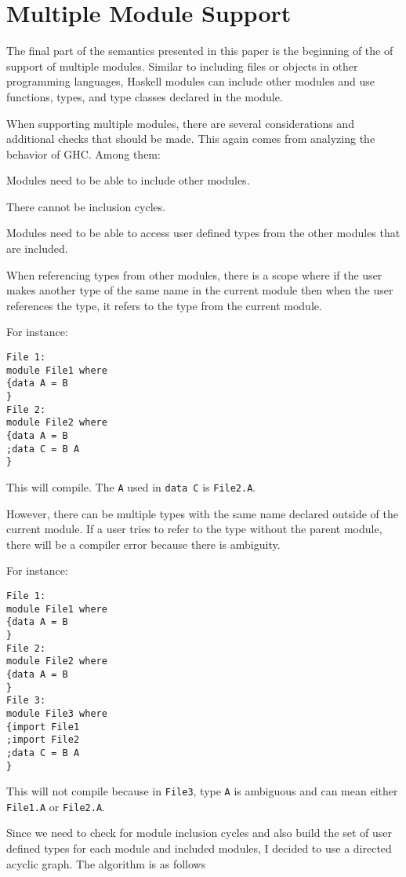 \chapter{Multiple Module Support}
The final part of the semantics presented in this paper is the beginning of the of support of multiple modules. Similar to including files or objects in other programming languages, Haskell modules can include other modules and use functions, types, and type classes declared in the module.

When supporting multiple modules, there are several considerations and additional checks that should be made. This again comes from analyzing the behavior of GHC.
Among them:

Modules need to be able to include other modules.

There cannot be inclusion cycles.

Modules need to be able to access user defined types from the other modules that are included.

When referencing types from other modules, there is a scope where if the user makes another type of the same name in the current module then when the user references the type, it refers to the type from the current module.

For instance:
\begin{lstlisting}
File 1:
module File1 where
{data A = B
}
File 2:
module File2 where
{data A = B
;data C = B A
}
\end{lstlisting}

This will compile. The \texttt{A} used in \texttt{data C} is \texttt{File2.A}.

However, there can be multiple types with the same name declared outside of the current module. If a user tries to refer to the type without the parent module, there will be a compiler error because there is ambiguity.

For instance:

\begin{lstlisting}
File 1:
module File1 where
{data A = B
}
File 2:
module File2 where
{data A = B
}
File 3:
module File3 where
{import File1
;import File2
;data C = B A
}
\end{lstlisting}

This will not compile because in \texttt{File3}, type \texttt{A} is ambiguous and can mean either \texttt{File1.A} or \texttt{File2.A}.

Since we need to check for module inclusion cycles and also build the set of user defined types for each module and included modules, I decided to use a directed acyclic graph.
The algorithm is as follows

